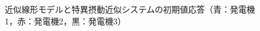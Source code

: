 \documentclass[tombow,dvipdfmx]{corona-a5}
\begin{document}
\begin{figure}[t]
{\begin{minipage}{0.32\linewidth}
  \end{minipage}
  \caption{近似線形モデルと特異摂動近似システムの初期値応答（青：発電機1，赤：発電機2，黒：発電機3）}
  \label{fig:timeexsp}
  }
\end{figure}







\newpage
\end{document}
